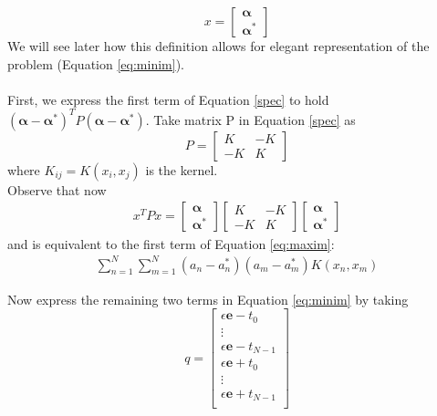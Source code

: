 \documentclass[12pt,a4paper,notitlepage,twoside]{scrbook}
\begin{document}
\[x =
  \begin{bmatrix}
    \bm{ \alpha} \\
    \bm{ \alpha^*}
  \end{bmatrix}
\]
We will see later how this definition allows for elegant representation of
the problem (Equation \ref{eq:minim}).
\paragraph*{}
First, we express the first term of Equation \ref{spec} to hold \((\bm{\alpha-\alpha^*})^T
P (\bm{\alpha - \alpha^*})\).
Take matrix P in Equation \ref{spec} as 
\[P =
\begin{bmatrix}
       K & -K           \\
       -K & K            
     \end{bmatrix}
\]
where \(K_{ij} = K(x_i,x_j)\) is the kernel.
\\
Observe that now
\begin{gather*}
x^T P x =
  \begin{bmatrix}
    \bm{ \alpha} \\
    \bm{ \alpha^*}
  \end{bmatrix}
\begin{bmatrix}
       K & -K           \\
       -K & K            
     \end{bmatrix}
  \begin{bmatrix}
    \bm{ \alpha} \\
    \bm{ \alpha^*}
  \end{bmatrix}
\end{gather*}
and is equivalent to the first term of Equation \ref{eq:maxim}:
\begin{gather*}
\sum_{n=1}^{N}\sum_{m=1}^{N}(a_n-a_n^*)(a_m-a_m^*)K(x_n,x_m)
\end{gather*}

Now express the remaining two terms in Equation \ref{eq:minim} by taking 
\[q =
\begin{bmatrix}
  \epsilon\mathbf{e}-t_0           \\
  \vdots                                     \\
  \epsilon\mathbf{e}-t_{N-1}           \\
   \epsilon\mathbf{e}+t_0           \\
   \vdots                           \\
  \epsilon\mathbf{e}+t_{N-1}           \\
     \end{bmatrix}
\]
\end{document}
